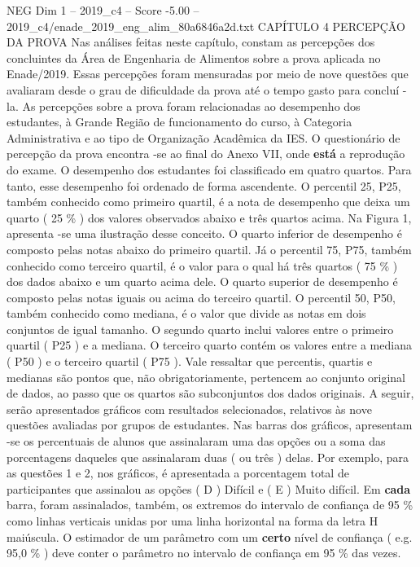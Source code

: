 \begin{textsample}{NEG Dim 1 – 2019\_c4 – Score -5.00 – 2019\_c4/enade\_2019\_eng\_alim\_80a6846a2d.txt}  \label{ex:f1_neg_083}
CAPÍTULO 4 PERCEPÇÃO DA PROVA Nas análises feitas neste capítulo, constam as percepções dos concluintes da Área de Engenharia de Alimentos sobre a prova aplicada no Enade/2019.
Essas percepções foram mensuradas por meio de nove questões que avaliaram desde o grau de dificuldade da prova até o tempo gasto para concluí -la.
As percepções sobre a prova foram relacionadas ao desempenho dos estudantes, à Grande Região de funcionamento do curso, à Categoria Administrativa e ao tipo de Organização Acadêmica da IES.
O questionário de percepção da prova encontra -se ao final do Anexo VII, onde \textbf{está} a reprodução do exame.
O desempenho dos estudantes foi classificado em quatro quartos.
Para tanto, esse desempenho foi ordenado de forma ascendente.
O percentil 25, P25, também conhecido como primeiro quartil, é a nota de desempenho que deixa um quarto ( 25 \% ) dos valores observados abaixo e três quartos acima.
Na Figura 1, apresenta -se uma ilustração desse conceito.
O quarto inferior de desempenho é composto pelas notas abaixo do primeiro quartil.
Já o percentil 75, P75, também conhecido como terceiro quartil, é o valor para o qual há três quartos ( 75 \% ) dos dados abaixo e um quarto acima dele.
O quarto superior de desempenho é composto pelas notas iguais ou acima do terceiro quartil.
O percentil 50, P50, também conhecido como mediana, é o valor que divide as notas em dois conjuntos de igual tamanho.
O segundo quarto inclui valores entre o primeiro quartil ( P25 ) e a mediana.
O terceiro quarto contém os valores entre a mediana ( P50 ) e o terceiro quartil ( P75 ).
Vale ressaltar que percentis, quartis e medianas são pontos que, não obrigatoriamente, pertencem ao conjunto original de dados, ao passo que os quartos são subconjuntos dos dados originais.
A seguir, serão apresentados gráficos com resultados selecionados, relativos às nove questões avaliadas por grupos de estudantes.
Nas barras dos gráficos, apresentam -se os percentuais de alunos que assinalaram uma das opções ou a soma das porcentagens daqueles que assinalaram duas ( ou três ) delas.
Por exemplo, para as questões 1 e 2, nos gráficos, é apresentada a porcentagem total de participantes que assinalou as opções ( D ) Difícil e ( E ) Muito difícil.
Em \textbf{cada} barra, foram assinalados, também, os extremos do intervalo de confiança de 95 \% como linhas verticais unidas por uma linha horizontal na forma da letra H maiúscula.
O estimador de um parâmetro com um \textbf{certo} nível de confiança ( e.g. 95,0 \% ) deve conter o parâmetro no intervalo de confiança em 95 \% das vezes.

\end{textsample}
